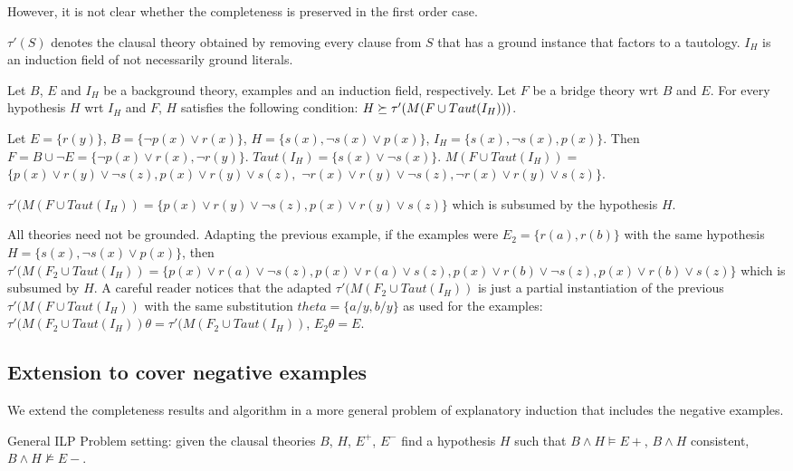 However, it is not clear whether the completeness is preserved in the first order case.

$\tau'(S)$ denotes the clausal theory obtained by removing every clause from $S$ that has a ground instance that factors to a tautology. $I_H$ is an induction field of not necessarily ground literals.

\begin{conjecture}\label{subsumptionConjectureFirstOrder}
Let $B$, $E$ and $I_H$ be a background theory, examples and an induction field, respectively. Let $F$ be a bridge theory wrt $B$ and $E$. For every hypothesis $H$ wrt $I_H$ and $F$, $H$ satisfies the following condition:
$H \succeq \tau'(M(F \cup Taut(I_H)))$.
\end{conjecture}

\begin{exmp}
Let $E=\{r(y)\}$,
$B=\{\neg p(x) \vee r(x)\}$,
$H=\{s(x), \neg s(x) \vee p(x)\}$,
$I_H=\{s(x), \neg s(x), p(x)\}$.
Then $F=B \cup \neg E=\{\neg p(x) \vee r(x), \neg r(y) \}$.
$Taut(I_H)=\{s(x) \vee \neg s(x)\}$.
$M(F \cup Taut(I_H))=$
$\{p(x) \vee r(y) \vee \neg s(z), p(x) \vee r(y) \vee s(z),$
$\neg r(x) \vee r(y) \vee \neg s(z),\neg r(x) \vee r(y) \vee s(z) \}$.

$\tau'(M(F \cup Taut(I_H))=\{p(x) \vee r(y) \vee \neg s(z), p(x) \vee r(y) \vee s(z)\}$ which is subsumed by the hypothesis $H$.
\end{exmp}

\begin{exmp}
All theories need not be grounded. Adapting the previous example, if the examples were
$E_2=\{r(a), r(b)\}$ with the same hypothesis
$H=\{s(x), \neg s(x) \vee p(x)\}$, then
$\tau'(M(F_2 \cup Taut(I_H))=\{p(x) \vee r(a) \vee \neg s(z), p(x) \vee r(a) \vee s(z), p(x) \vee r(b) \vee \neg s(z), p(x) \vee r(b) \vee s(z) \}$ which is subsumed by $H$. A careful reader notices that the adapted $\tau'(M(F_2 \cup Taut(I_H))$ is just a partial instantiation of the previous
$\tau'(M(F \cup Taut(I_H))$ with the same substitution
$theta=\{a / y, b / y\}$ as used for the examples:
$\tau'(M(F_2 \cup Taut(I_H)) \theta=\tau'(M(F_2 \cup Taut(I_H))$,
$E_2 \theta = E$.
\end{exmp}

\subsection{Extension to cover negative examples}
We extend the completeness results and algorithm in a more general problem of explanatory induction that includes the negative examples.
\begin{defn}General ILP Problem setting: given the clausal theories $B$, $H$, $E^+$, $E^-$ find a hypothesis $H$ such that $B \wedge H \models E+$, $B \wedge H$ consistent, $B \wedge H \not\models E-$.
\end{defn}

